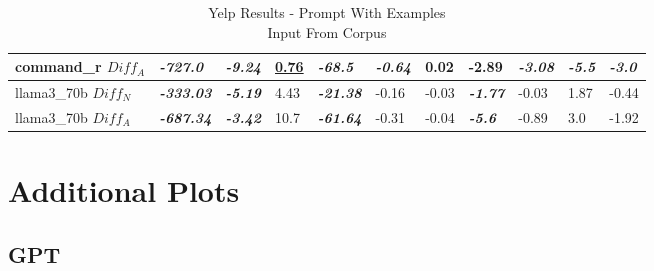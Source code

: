 \documentclass[a4paper,twoside]{article}
\begin{document}
\begin{table}[!ht]
{\begin{tabular}{lllllllllll}
            command\_r $Diff_A$  & \textbf{\textit{-727.0}}  & \textbf{\textit{-9.24}} & \textbf{\underline{0.76}} & \textbf{\textit{-68.5}}  & \textbf{\textit{-0.64}} & 0.02        & -2.89                   & \textbf{\textit{-3.08}} & \textbf{\textit{-5.5}}  & \textbf{\textit{-3.0}}  \\ \midrule
            llama3\_70b $Diff_N$ & \textbf{\textit{-333.03}} & \textbf{\textit{-5.19}} & 4.43                      & \textbf{\textit{-21.38}} & -0.16                   & -0.03       & \textbf{\textit{-1.77}} & -0.03                   & 1.87                    & -0.44                   \\ \midrule
            llama3\_70b $Diff_A$ & \textbf{\textit{-687.34}} & \textbf{\textit{-3.42}} & 10.7                      & \textbf{\textit{-61.64}} & -0.31                   & -0.04       & \textbf{\textit{-5.6}}  & -0.89                   & 3.0                     & -1.92                   \\ \bottomrule
        \end{tabular}%
    }
    \caption{Yelp Results - Prompt With Examples\\Input From Corpus}\label{table-prompt-2-ifd-yelp}
\end{table}

\section{Additional Plots}

\subsection{GPT}
\end{document}
